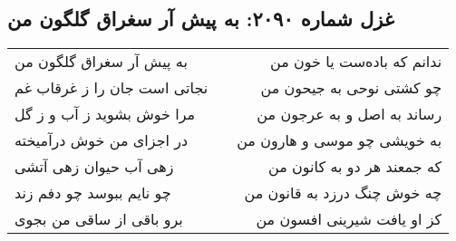 \begin{center}
\section*{غزل شماره ۲۰۹۰: به پیش آر سغراق گلگون من}
\label{sec:2090}
\begin{longtable}{l p{0.5cm} r}
به پیش آر سغراق گلگون من
&&
ندانم که باده‌ست یا خون من
\\
نجاتی است جان را ز غرقاب غم
&&
چو کشتی نوحی به جیحون من
\\
مرا خوش بشوید ز آب و ز گل
&&
رساند به اصل و به عرجون من
\\
در اجزای من خوش درآمیخته
&&
به خویشی چو موسی و هارون من
\\
زهی آب حیوان زهی آتشی
&&
که جمعند هر دو به کانون من
\\
چو نایم ببوسد چو دفم زند
&&
چه خوش چنگ درزد به قانون من
\\
برو باقی از ساقی من بجوی
&&
کز او یافت شیرینی افسون من
\\
\end{longtable}
\end{center}

